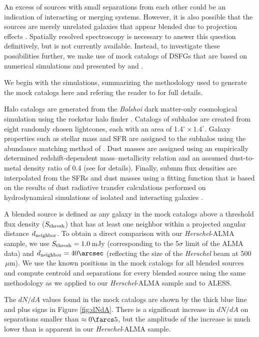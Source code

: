 \documentclass[iop]{emulateapj}
\begin{document}
An excess of sources with small separations from each other could be an
indication of interacting or merging systems.  However, it is also possible
that the sources are merely unrelated galaxies that appear blended due to
projection effects \citep{HB13, Cowley:2015lr, Munoz-Arancibia:2015qy}.
Spatially resolved spectroscopy is necessary to answer this question
definitively, but is not currently available.  Instead, to investigate these
possibilities further, we make use of mock catalogs of DSFGs that are based on
numerical simulations and presented by \citet{HB13} and \citet{Cowley:2015lr}.  

We begin with the \citet{HB13} simulations, summarizing the methodology used to
generate the mock catalogs here and refering the reader to \citet{HB13} for
full details. 

Halo catalogs are generated from the {\it Bolshoi} dark matter-only
cosmological simulation \citep{Klypin11} using the {\sc rockstar} halo finder
\citep{Behroozi13a, Behroozi13b}.  Catalogs of subhalos are created from eight
randomly chosen lightcones, each with an area of 1.4$^\circ \times 1.4^\circ$.
Galaxy properties such as stellar mass and SFR are assigned to the subhalos
using the abundance matching method of \citet{Behroozi13c}.  Dust masses are
assigned using an empirically determined redshift-dependent mass--metallicity
relation and an assumed dust-to-metal density ratio of 0.4 (see \citealt{HN13}
for details). Finally, submm flux densities are interpolated from the SFRs and
dust masses using a fitting function that is based on the results of dust
radiative transfer calculations performed on hydrodynamical simulations of
isolated and interacting galaxies \citep{H11,H12,HN13}.

A blended source is defined as any galaxy in the mock catalogs above a
threshold flux density ($S_{\rm thresh}$) that has at least one neighbor within
a projected angular distance $d_{\rm neighbor}$.  To obtain a direct comparison
with our {\it Herschel}-ALMA sample, we use $S_{\rm thresh} = 1.0\,$mJy
(corresponding to the 5$\sigma$ limit of the ALMA data) and $d_{\rm neighbor} =
40\arcsec$ (reflecting the size of the {\it Herschel} beam at 500$\,\mu$m).  We
use the known positions in the mock catalogs for all blended sources and
compute centroid and separations for every blended source using the same
methodology as we applied to our {\it Herschel}-ALMA sample and to ALESS.  

The $dN/dA$ values found in the mock catalogs are shown by the thick blue line
and plus signs in Figure \ref{fig:dNdA}.  There is a significant increase in
$dN/dA$ on separations smaller than $\approx 0\farcs5$, but the amplitude of
the increase is much lower than is apparent in our {\it Herschel}-ALMA sample. 
\end{document}
